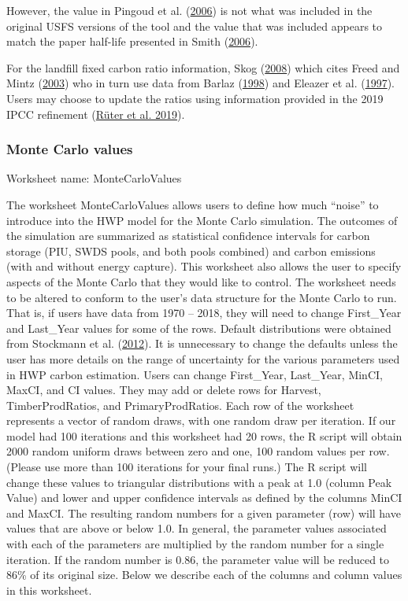 \documentclass[
  openany]{book}
\begin{document}
However, the value in Pingoud et al.
(\protect\hyperlink{ref-pingoud2006}{2006}) is not what was included in
the original USFS versions of the tool and the value that was included
appears to match the paper half-life presented in Smith
(\protect\hyperlink{ref-smith2006}{2006}).

For the landfill fixed carbon ratio information, Skog
(\protect\hyperlink{ref-skog2008}{2008}) which cites Freed and Mintz
(\protect\hyperlink{ref-freed2003}{2003}) who in turn use data from
Barlaz (\protect\hyperlink{ref-barlaz1998}{1998}) and Eleazer et al.
(\protect\hyperlink{ref-eleazer1997}{1997}). Users may choose to update
the ratios using information provided in the 2019 IPCC refinement
(\protect\hyperlink{ref-ruter2019}{Rüter et al. 2019}).

\hypertarget{own-prov-input-mc}{%
\subsubsection{Monte Carlo values}\label{own-prov-input-mc}}

Worksheet name: MonteCarloValues

The worksheet MonteCarloValues allows users to define how much ``noise''
to introduce into the HWP model for the Monte Carlo simulation. The
outcomes of the simulation are summarized as statistical confidence
intervals for carbon storage (PIU, SWDS pools, and both pools combined)
and carbon emissions (with and without energy capture). This worksheet
also allows the user to specify aspects of the Monte Carlo that they
would like to control. The worksheet needs to be altered to conform to
the user's data structure for the Monte Carlo to run. That is, if users
have data from 1970 -- 2018, they will need to change First\_Year and
Last\_Year values for some of the rows. Default distributions were
obtained from Stockmann et al.
(\protect\hyperlink{ref-stockmann2012}{2012}). It is unnecessary to
change the defaults unless the user has more details on the range of
uncertainty for the various parameters used in HWP carbon estimation.
Users can change First\_Year, Last\_Year, MinCI, MaxCI, and CI values.
They may add or delete rows for Harvest, TimberProdRatios, and
PrimaryProdRatios. Each row of the worksheet represents a vector of
random draws, with one random draw per iteration. If our model had 100
iterations and this worksheet had 20 rows, the R script will obtain 2000
random uniform draws between zero and one, 100 random values per row.
(Please use more than 100 iterations for your final runs.) The R script
will change these values to triangular distributions with a peak at 1.0
(column Peak Value) and lower and upper confidence intervals as defined
by the columns MinCI and MaxCI. The resulting random numbers for a given
parameter (row) will have values that are above or below 1.0. In
general, the parameter values associated with each of the parameters are
multiplied by the random number for a single iteration. If the random
number is 0.86, the parameter value will be reduced to 86\% of its
original size. Below we describe each of the columns and column values
in this worksheet.
\end{document}
